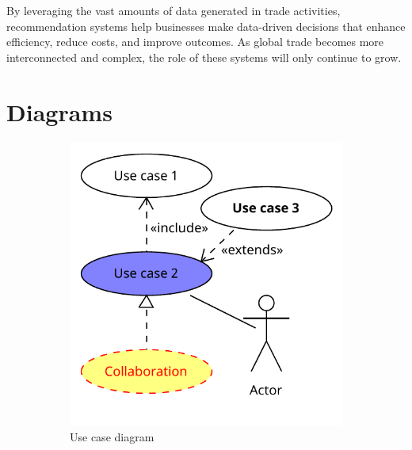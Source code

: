 \documentclass[10pt,twocolumn,twoside,slovak,a4paper]{article}
\begin{document}
\noindent By leveraging the vast amounts of data generated in trade activities, recommendation systems help businesses make data-driven decisions that enhance efficiency, reduce costs, and improve outcomes. As global trade becomes more interconnected and complex, the role of these systems will only continue to grow.




\section{Diagrams} \label{dolezitejsia}

\begin{figure}[htbp]
    \centering
    \begin{subfigure}[b]{0.45\textwidth}
        \centering
        \includegraphics[width=\textwidth]{Diagrams/Diagram.pdf}
        \caption{Use case diagram}
        \label{fig:collaborative_filtering}
    \end{subfigure}
    \hfill
    \begin{subfigure}[b]{0.45\textwidth}
        \centering

\end{subfigure}
\end{figure}
\end{document}
